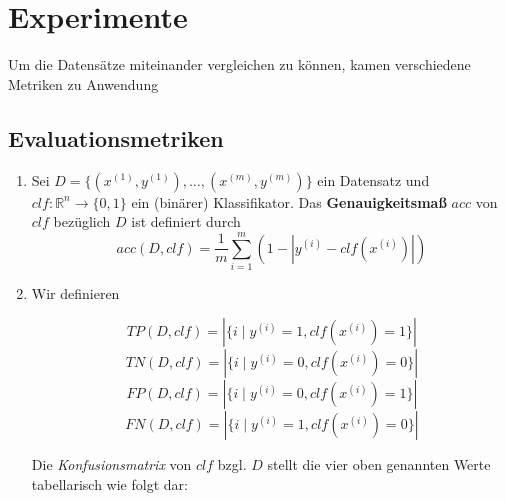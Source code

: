 \section{Experimente}

Um die Datensätze miteinander vergleichen zu können, kamen verschiedene Metriken zu Anwendung


\subsection{Evaluationsmetriken}
\begin{enumerate}
    \item 
Sei $D = \{(x^{(1)}, y^{(1)}), \dots, (x^{(m)}, y^{(m)})\}$ ein Datensatz und $clf: \mathbb{R}^n \to \{0, 1\}$ ein (binärer) Klassifikator. Das \textbf{Genauigkeitsmaß} $acc$ von $clf$ bezüglich $D$ ist definiert durch
\begin{equation}
    acc(D, clf) = \frac{1}{m} \sum_{i=1}^{m} \left(1 - \left|y^{(i)} - clf(x^{(i)})\right|\right)
\end{equation}
    
\item 
Wir definieren

\begin{equation}
    TP(D, clf) = |\{i \mid y^{(i)} = 1, clf(x^{(i)}) = 1\}|
\end{equation}
\begin{equation}
    TN(D, clf) = |\{i \mid y^{(i)} = 0, clf(x^{(i)}) = 0\}|
\end{equation}
\begin{equation}
    FP(D, clf) = |\{i \mid y^{(i)} = 0, clf(x^{(i)}) = 1\}|
\end{equation}
\begin{equation}
    FN(D, clf) = |\{i \mid y^{(i)} = 1, clf(x^{(i)}) = 0\}|
\end{equation}

Die \textit{Konfusionsmatrix} von $clf$ bzgl. $D$ stellt die vier oben genannten Werte tabellarisch wie folgt dar:


\end{enumerate}

